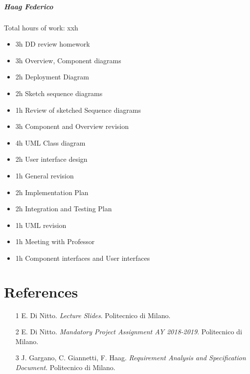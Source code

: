 \documentclass{report}
\newcommand{\ic}[1]{\textit{#1}}
\begin{document}
		\paragraph{Haag Federico} Total hours of work: xxh
			\begin{itemize}
				\item 3h DD review homework
				\item 3h Overview, Component diagrams
				\item 2h Deployment Diagram
				\item 2h Sketch sequence diagrams
				\item 1h Review of sketched Sequence diagrams
				\item 3h Component and Overview revision
				\item 4h UML Class diagram
				\item 2h User interface design
				\item 1h General revision
				\item 2h Implementation Plan
				\item 2h Integration and Testing Plan
				\item 1h UML revision
				\item 1h Meeting with Professor
				\item 1h Component interfaces and User interfaces
			\end{itemize}
			
	\chapter{References}
	\thispagestyle{fancy}
	\begin{itemize}
		\item [1]\label{ref:1} E. Di Nitto. \ic{Lecture Slides}. Politecnico di Milano.
		\item [2]\label{ref:2} E. Di Nitto. \ic{Mandatory Project Assignment AY 2018-2019}. Politecnico di Milano.
		\item [3]\label{ref:3} J. Gargano, C. Giannetti, F. Haag. \ic{Requirement Analysis and Specification Document}. Politecnico di Milano.
	\end{itemize}
	
\end{document}

